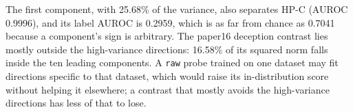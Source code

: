 The first component, with 25.68\% of the variance, also separates HP-C (AUROC 0.9996), and its label AUROC is 0.2959, which is as far from chance as 0.7041 because a component's sign is arbitrary. %
The paper16 deception contrast lies mostly outside the high-variance directions: 16.58\% of its squared norm falls inside the ten leading components. %
A \texttt{raw} probe trained on one dataset may fit directions specific to that dataset, which would raise its in-distribution score without helping it elsewhere; a contrast that mostly avoids the high-variance directions has less of that to lose. %

